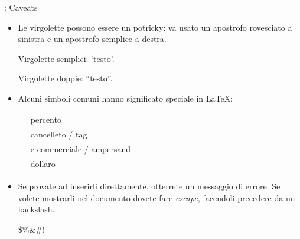 \documentclass{beamer}
\begin{document}
\begin{frame}[fragile]{\insertsubsection{}: Caveats}
\small
\begin{itemize}
\item Le virgolette possono essere un po\' tricky: va usato un apostrofo rovesciato \keystroke{\`{}} a sinistra e un apostrofo semplice \keystroke{\'{}} a destra.
\begin{exampletwouptiny}
Virgolette semplici: `testo'.

Virgolette doppie: ``testo''.
\end{exampletwouptiny}

\item Alcuni simboli comuni hanno significato speciale in \LaTeX:\\[1ex]
\begin{tabular}{cl}
\keystrokebftt{\%} & percento					\\
\keystrokebftt{\#} & cancelleto / tag			\\
\keystrokebftt{\&} & e commerciale / ampersand	\\
\keystrokebftt{\$} & dollaro					\\
\end{tabular}
\item Se provate ad inserirli direttamente, otterrete un messaggio di errore.
Se volete mostrarli nel documento dovete fare \emph{escape}, facendoli precedere
da un backslash.
\begin{exampletwoup}
\$\%\&\#!
\end{exampletwoup}
\end{itemize}
\end{frame}
\end{document}
